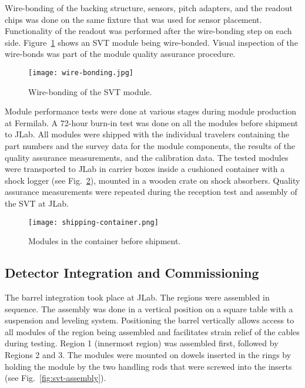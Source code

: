Wire-bonding of the backing structure, sensors, pitch adapters, and the readout chips was done on the same fixture that was used for sensor placement. Functionality of the readout was performed after the wire-bonding step on each side. Figure~\ref{fig:wire-bonding} shows an SVT module being wire-bonded. Visual inspection of the wire-bonds was part of the module quality assurance procedure.

\begin{figure}[hbt] 
\centering 
\texttt{[image: wire-bonding.jpg]}
\caption{Wire-bonding of the SVT module.}
\label{fig:wire-bonding}
\end{figure}

Module performance tests were done at various stages during module production at Fermilab. A 72-hour burn-in test was done on all the modules before shipment to JLab. All modules were shipped with the individual travelers containing the part numbers and the survey data for the module components, the results of the quality assurance measurements, and the calibration data. The tested modules were transported to JLab in carrier boxes inside a cushioned container with a shock logger (see Fig.~\ref{fig:shipping-container}), mounted in a wooden crate on shock absorbers. Quality assurance measurements were repeated during the reception test and assembly of the SVT at JLab. 

\begin{figure}[hbt] 
\centering 
\texttt{[image: shipping-container.png]}
\caption{Modules in the container before shipment.}
\label{fig:shipping-container}
\end{figure}

\subsection{Detector Integration and Commissioning}

The barrel integration took place at JLab. The regions were assembled in sequence. The assembly was done in a vertical position on a square table with a suspension and leveling system. Positioning the barrel vertically allows access to all modules of the region being assembled and facilitates strain relief of the cables during testing. Region 1 (innermost region) was assembled first, followed by Regions 2 and 3. The modules were mounted on dowels inserted in the rings by holding the module by the two handling rods that were screwed into the inserts (see Fig.~\ref{fig:svt-assembly}). 


